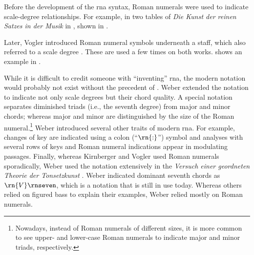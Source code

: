 



Before the development of the \gls{rna} syntax, Roman
numerals were used to indicate scale-degree relationships.
For example, in two tables of \emph{Die Kunst der reinen
Satzes in der Musik} in \textcite{kirnberger1774kunst},
shown in .

 

Later, Vogler introduced Roman numeral symbols underneath a
staff, which also referred to a scale degree
\parencite{vogler1778grunde, vogler1802handbuch}. These are
used a few times on both works.
 shows an
example in \textcite{vogler1778grunde}.


While it is difficult to credit someone with ``inventing''
\gls{rna}, the modern notation would probably not exist
without the precedent of \textcite{weber1817versuch}. Weber
extended the notation to indicate not only scale degrees but
their chord quality. A special notation separates diminished
triads (i.e., the seventh degree) from major and minor
chords; whereas major and minor are distinguished by the
size of the Roman numeral.\footnote{Nowadays, instead of
Roman numerals of different sizes, it is more common to see
upper- and lower-case Roman numerals to indicate major and
minor triads, respectively.} Weber introduced several other
traits of modern \gls{rna}. For example, changes of key are
indicated using a colon (``$\rn{:}$'') symbol and analyses
with several rows of keys and Roman numeral indications
appear in modulating passages. Finally, whereas Kirnberger
and Vogler used Roman numerals sporadically, Weber used the
notation extensively in the
\emph{Versuch einer geordneten Theorie der Tonsetzkunst}
\parencite{weber1817versuch}. Weber indicated dominant
seventh chords as $\rn{V}\rnseven$, which is a notation that
is still in use today. Whereas others relied on figured bass
to explain their examples, Weber relied mostly on Roman
numerals.
